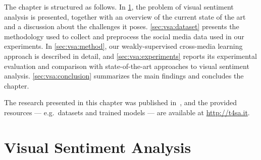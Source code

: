 The chapter is structured as follows.
In \ref{sec:vsa:introduction}, the problem of visual sentiment analysis is presented, together with an overview of the current state of the art and a discussion about the challenges it poses.
\ref{sec:vsa:dataset} presents the methodology used to collect and preprocess the social media data used in our experiments.
In \ref{sec:vsa:method}, our weakly-supervised cross-media learning approach is described in detail, and \ref{sec:vsa:experiments} reports its experimental evaluation and comparison with state-of-the-art approaches to visual sentiment analysis.
\ref{sec:vsa:conclusion} summarizes the main findings and concludes the chapter.

The research presented in this chapter was published in~\cite{vadicamo2017cross}, and the provided resources --- e.g.\ datasets and trained models --- are available at \url{http://t4sa.it}.



\section{Visual Sentiment Analysis}
\label{sec:vsa:introduction}

